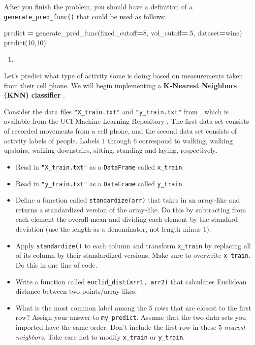 \documentclass[12pt,krantz2]{krantz}
\makeatletter
\newenvironment{Shaded}{\begin{snugshade}}{\end{snugshade}}
\newcommand{\DecValTok}[1]{\textcolor[rgb]{0.06,0.06,0.06}{#1}}
\newcommand{\NormalTok}[1]{#1}
\newcommand{\OperatorTok}[1]{\textcolor[rgb]{0.43,0.43,0.43}{\textbf{#1}}}
\providecommand{\tightlist}{%
  \setlength{\itemsep}{0pt}\setlength{\parskip}{0pt}}
\newenvironment{kframe}{%
\medskip{}
\setlength{\fboxsep}{.8em}
 \def\at@end@of@kframe{}%
 \ifinner\ifhmode%
  \def\at@end@of@kframe{\end{minipage}}%
  \begin{minipage}{\columnwidth}%
 \fi\fi%
 \def\FrameCommand##1{\hskip\@totalleftmargin \hskip-\fboxsep
 \colorbox{shadecolor}{##1}\hskip-\fboxsep
     \hskip-\linewidth \hskip-\@totalleftmargin \hskip\columnwidth}%
 \MakeFramed {\advance\hsize-\width
   \@totalleftmargin\z@ \linewidth\hsize
   \@setminipage}}%
 {\par\unskip\endMakeFramed%
 \at@end@of@kframe}
\renewenvironment{Shaded}{\begin{kframe}}{\end{kframe}}
\makeatother
\begin{document}
After you finish the problem, you should have a definition of a \texttt{generate\_pred\_func()} that could be used as follows:

\begin{Shaded}
\begin{Highlighting}[]
\NormalTok{predict }\OperatorTok{=}\NormalTok{ generate_pred_func(fixed_cutoff}\OperatorTok{=}\DecValTok{8}\NormalTok{, vol_cutoff}\OperatorTok{=}\NormalTok{.}\DecValTok{5}\NormalTok{, dataset}\OperatorTok{=}\NormalTok{wine)}
\NormalTok{predict(}\DecValTok{10}\NormalTok{,}\DecValTok{10}\NormalTok{)}
\end{Highlighting}
\end{Shaded}

\begin{enumerate}
\def\labelenumi{\arabic{enumi}.}
\setcounter{enumi}{2}
\item
\end{enumerate}

Let's predict what type of activity some is doing based on measurements taken from their cell phone. We will begin implementing a \textbf{K-Nearest Neighbors (KNN) classifier} \citep{knn1} \citep{knn2}.

Consider the data files \texttt{"X\_train.txt"} and \texttt{"y\_train.txt"} from \citep{Anguita2013APD}, which is available from the UCI Machine Learning Repository \citep{uci_data}. The first data set consists of recorded movements from a cell phone, and the second data set consists of activity labels of people. Labels \(1\) through \(6\) correspond to walking, walking upstairs, walking downstairs, sitting, standing and laying, respectively.

\begin{itemize}
\tightlist
\item
  Read in \texttt{"X\_train.txt"} as a \texttt{DataFrame} called \texttt{x\_train}.
\item
  Read in \texttt{"y\_train.txt"} as a \texttt{DataFrame} called \texttt{y\_train}
\item
  Define a function called \texttt{standardize(arr)} that takes in an array-like and returns a standardized version of the array-like. Do this by subtracting from each element the overall mean and dividing each element by the standard deviation (use the length as a denominator, not length minus \(1\)).
\item
  Apply \texttt{standardize()} to each column and transform \texttt{x\_train} by replacing all of its column by their standardized versions. Make sure to overwrite \texttt{x\_train}. Do this in one line of code.
\item
  Write a function called \texttt{euclid\_dist(arr1,\ arr2)} that calculates Euclidean distance between two points/array-likes.
\item
  What is the most common label among the 5 rows that are closest to the first row? Assign your answer to \texttt{my\_predict}. Assume that the two data sets you imported have the same order. Don't include the first row in these \(5\) \emph{nearest neighbors}. Take care not to modify \texttt{x\_train} or \texttt{y\_train}.
\end{itemize}
\end{document}
